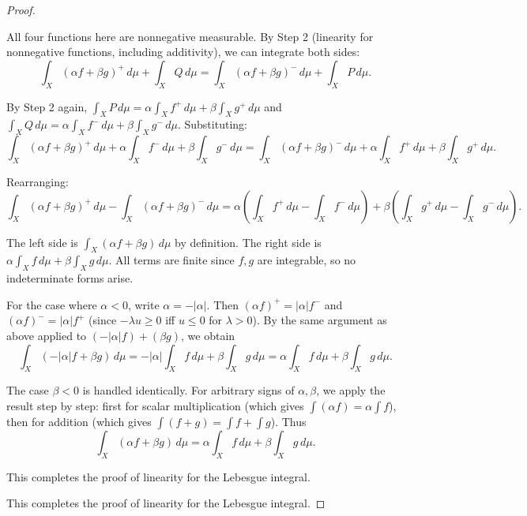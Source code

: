 \begin{proof}
\begin{enumerate}
    All four functions here are nonnegative measurable. By Step 2 (linearity for nonnegative functions, including additivity), we can integrate both sides:
    $$\int_X (\alpha f + \beta g)^+\,d\mu + \int_X Q\,d\mu = \int_X (\alpha f + \beta g)^-\,d\mu + \int_X P\,d\mu.$$

    By Step 2 again, $\int_X P\,d\mu = \alpha \int_X f^+\,d\mu + \beta \int_X g^+\,d\mu$ and $\int_X Q\,d\mu = \alpha \int_X f^-\,d\mu + \beta \int_X g^-\,d\mu$. Substituting:
    $$\int_X (\alpha f + \beta g)^+\,d\mu + \alpha \int_X f^-\,d\mu + \beta \int_X g^-\,d\mu = \int_X (\alpha f + \beta g)^-\,d\mu + \alpha \int_X f^+\,d\mu + \beta \int_X g^+\,d\mu.$$

    Rearranging:
    $$\int_X (\alpha f + \beta g)^+\,d\mu - \int_X (\alpha f + \beta g)^-\,d\mu = \alpha\left(\int_X f^+\,d\mu - \int_X f^-\,d\mu\right) + \beta\left(\int_X g^+\,d\mu - \int_X g^-\,d\mu\right).$$

    The left side is $\int_X (\alpha f + \beta g)\,d\mu$ by definition. The right side is $\alpha \int_X f\,d\mu + \beta \int_X g\,d\mu$. All terms are finite since $f,g$ are integrable, so no indeterminate forms arise.

    For the case where $\alpha < 0$, write $\alpha = -|\alpha|$. Then $(\alpha f)^+ = |\alpha|f^-$ and $(\alpha f)^- = |\alpha|f^+$ (since $-\lambda u \geq 0$ iff $u \leq 0$ for $\lambda > 0$). By the same argument as above applied to $(-|\alpha|f) + (\beta g)$, we obtain
    $$\int_X (-|\alpha|f + \beta g)\,d\mu = -|\alpha| \int_X f\,d\mu + \beta \int_X g\,d\mu = \alpha \int_X f\,d\mu + \beta \int_X g\,d\mu.$$

    The case $\beta < 0$ is handled identically. For arbitrary signs of $\alpha,\beta$, we apply the result step by step: first for scalar multiplication (which gives $\int (\alpha f) = \alpha \int f$), then for addition (which gives $\int(f+g) = \int f + \int g$). Thus
    $$\int_X (\alpha f + \beta g)\,d\mu = \alpha \int_X f\,d\mu + \beta \int_X g\,d\mu.$$

    This completes the proof of linearity for the Lebesgue integral.
\end{enumerate}
This completes the proof of linearity for the Lebesgue integral.
\end{proof}
